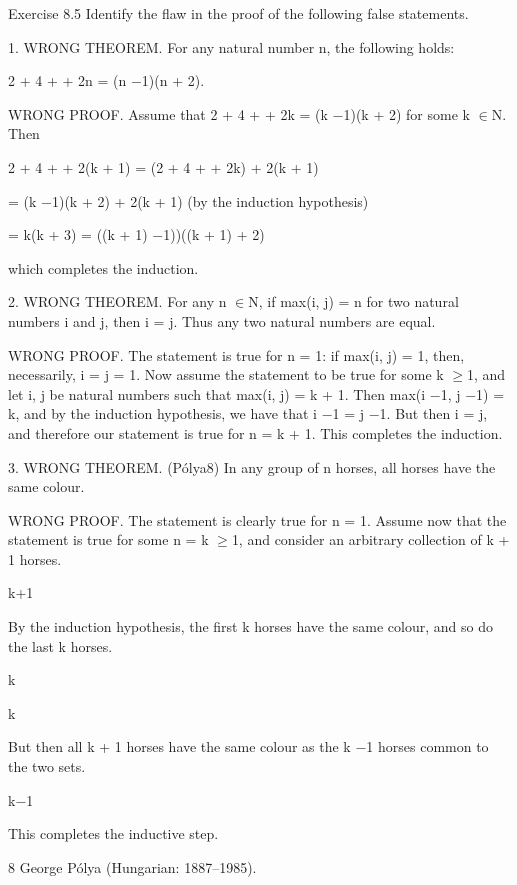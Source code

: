 \documentclass[11pt]{article}
\theoremstyle{plain}
\theoremstyle{definition}
\begin{document}
Exercise 8.5 Identify the flaw in the proof of the following false statements.

1. WRONG THEOREM. For any natural number n, the following holds:

2 + 4 + \textperiodcentered{} \textperiodcentered{} \textperiodcentered{} + 2n = (n $-$1)(n + 2).

WRONG PROOF. Assume that 2 + 4 + \textperiodcentered{} \textperiodcentered{} \textperiodcentered{} + 2k = (k $-$1)(k + 2) for some k $\in$N. Then

2 + 4 + \textperiodcentered{} \textperiodcentered{} \textperiodcentered{} + 2(k + 1) = (2 + 4 + \textperiodcentered{} \textperiodcentered{} \textperiodcentered{} + 2k) + 2(k + 1)

= (k $-$1)(k + 2) + 2(k + 1) (by the induction hypothesis)

= k(k + 3) = ((k + 1) $-$1))((k + 1) + 2)

which completes the induction. 

2. WRONG THEOREM. For any n $\in$N, if max(i, j) = n for two natural numbers i and j, then i = j. Thus any two natural numbers are equal.

WRONG PROOF. The statement is true for n = 1: if max(i, j) = 1, then, necessarily, i = j = 1. Now assume the statement to be true for some k $\geq$1, and let i, j be natural numbers such that max(i, j) = k + 1. Then max(i $-$1, j $-$1) = k, and by the induction hypothesis, we have that i $-$1 = j $-$1. But then i = j, and therefore our statement is true for n = k + 1. This completes the induction. 

3. WRONG THEOREM. (Pólya8) In any group of n horses, all horses have the same colour.

WRONG PROOF. The statement is clearly true for n = 1. Assume now that the statement is true for some n = k $\geq$1, and consider an arbitrary collection of k + 1 horses.

\textbullet{} \textbullet{} \textperiodcentered{} \textperiodcentered{} \textperiodcentered{} \textbullet{} \textbullet{}

k+1

By the induction hypothesis, the first k horses have the same colour, and so do the last k horses.

k

\textbullet{}

\textbullet{} \textbullet{} \textperiodcentered{} \textperiodcentered{} \textperiodcentered{} \textbullet{}

k

But then all k + 1 horses have the same colour as the k $-$1 horses common to the two sets.

\textbullet{} \textbullet{} \textperiodcentered{} \textperiodcentered{} \textperiodcentered{} \textbullet{}

\textbullet{}

k$-$1

This completes the inductive step. 

8 George Pólya (Hungarian: 1887--1985).
\end{document}
